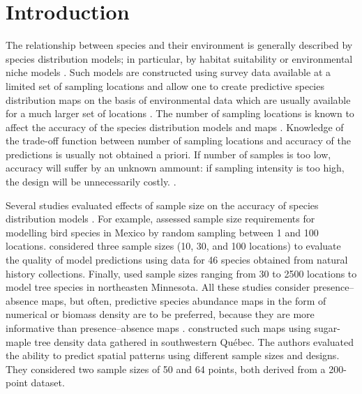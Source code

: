 \documentclass[review]{elsarticle}
\begin{document}
\linenumbers

\section{Introduction}

The relationship between species and their environment is generally described
by species distribution models; in particular, by habitat suitability or environmental niche models \citep{guisan2005}. Such models are constructed using survey data available at a limited set of sampling locations and allow one to create predictive species distribution maps on the basis of environmental data which are usually available for a much larger set of locations \citep{guisan2000}. The number of sampling locations is known to affect the accuracy of the species distribution models and maps \citep{stockwell2002, wisz2008}.  Knowledge of the trade-off function between number of sampling locations and accuracy of the predictions is usually not obtained a priori.  If number of samples is too low, accuracy will suffer by an unknown ammount: if sampling intensity is too high, the design will be unnecessarily costly.  \citep{caughlan2001,reynolds2011}.

Several studies evaluated effects of sample size on the accuracy of species distribution models \citep{stockwell2002,pearson2007,wisz2008,hanberry2012}. For example, \citet{stockwell2002} assessed sample size requirements for modelling bird species in Mexico by random sampling between 1 and 100 locations. \citet{wisz2008} considered three sample sizes (10, 30, and 100 locations) to evaluate the quality of model predictions using data for 46 species obtained from natural history collections. Finally, \citet{hanberry2012} used sample sizes ranging from 30 to 2500 locations to model tree species in northeasten  Minnesota. All these studies consider presence--absence maps, but often, predictive species abundance maps in the form of numerical or biomass density are to be preferred,  because they are more informative than presence--absence maps \citep{vieira2012, cozzi2013}.  \citet{fortin1989} constructed such maps using sugar-maple tree density data gathered in  southwestern Qu\'{e}bec.  The authors evaluated the ability to predict spatial patterns using different sample sizes and designs. They considered two sample sizes of 50 and 64 points, both derived from a 200-point dataset.
\end{document}
